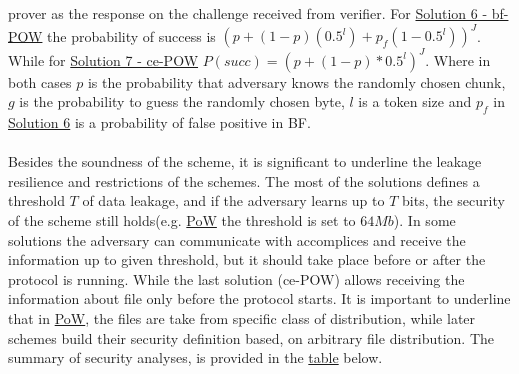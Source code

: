 \documentclass[12pt]{article}
\begin{document}
prover as the response on the challenge received from verifier.  For  \hyperref[sub:Soltuion6]{Solution 6 - bf-POW} the probability of success is $(p+(1-p)(0.5^l)+p_f(1-0.5^l))^J$. While for \hyperref[sub:Soltuion7]{Solution 7 - ce-POW} $P(succ) = (p+(1-p)*0.5^l)^J$. Where in both cases $p$ is the probability that adversary knows the randomly chosen chunk, $g$ is the probability to guess the randomly chosen byte, $l$ is a token size and $p_f$ in \hyperref[sub:Soltuion6]{Solution 6} is a probability of false positive in BF.\\\\
Besides the soundness of the scheme, it is significant to underline the leakage resilience  and restrictions of the schemes. The most of the solutions defines a threshold $T$ of data leakage, and if the adversary learns up to $T$ bits, the security of the scheme still holds(e.g.  \hyperref[sub:Soltuion1]{PoW} the threshold is set to $64Mb$). In some solutions the adversary can communicate with accomplices and receive the information up to given threshold, but it should take place before or after the protocol is running. While the last solution (ce-POW)  allows receiving the information about file only before the protocol starts. It is important to underline that in \hyperref[sub:Soltuion1]{PoW}, the files are take from specific class of distribution, while later schemes build their security definition based, on arbitrary file distribution.  The summary of security analyses, is provided in the \hyperref[table:Security]{table} below.
\end{document}
